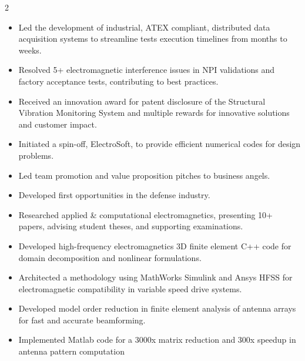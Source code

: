 \documentclass[9.5pt,a4paper,ragged2e,withhyper]{altacv} %
\begin{document}
\begin{paracol}{2}
\begin{itemize}
\item Led the development of industrial, ATEX compliant, distributed data acquisition
systems to streamline tests execution timelines from months to weeks.
\item Resolved 5+ electromagnetic interference issues in NPI validations and factory
acceptance tests, contributing to best practices.
\item Received an innovation award for patent disclosure of the Structural Vibration
Monitoring System and multiple rewards for innovative solutions and customer impact.
\end{itemize}
\divider

\begin{itemize}
\item Initiated a spin-off, ElectroSoft, to provide efficient numerical codes for design problems.
\item Led team promotion and value proposition pitches to business angels.
\item Developed first opportunities in the defense industry.
\end{itemize}
\divider

\begin{itemize}
\item Researched applied \& computational electromagnetics, presenting 10+ papers, advising student theses, and supporting examinations.
\item Developed high-frequency electromagnetics 3D finite element C++ code for domain decomposition and nonlinear formulations.
\item Architected a methodology using MathWorks Simulink and Ansys HFSS for electromagnetic compatibility in variable speed drive systems.
\end{itemize}
\divider

\begin{itemize}
\item Developed model order reduction in finite element analysis of antenna arrays for fast and accurate beamforming.
\item Implemented Matlab code for a 3000x matrix reduction and 300x speedup in antenna pattern computation
\end{itemize}
\divider


\end{paracol}
\end{document}

